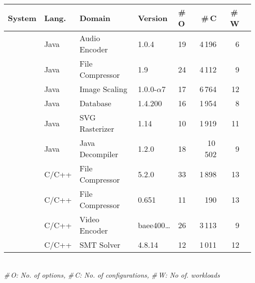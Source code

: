 \begin{tabular}{p{1.1cm}p{0.6cm}p{1.9cm}p{0.99cm}p{0.2cm}rrr}
		\toprule
		\textbf{System} & \textbf{Lang.} & \textbf{Domain} & \textbf{Version} & \textbf{\#\,O} & \textbf{\#\,C} & \textbf{\#\,W}  \\
		
		 
		\midrule
		\jumper & Java & Audio Encoder & 1.0.4 & 19 & 4\,196 & 6   \\
		
		\kanzi &Java  & File Compressor & 1.9 & 24 & 4\,112 & 9 \\
			
		\dconvert & Java & Image Scaling & 1.0.0-$\alpha$7 & 17 & 6\,764 & 12  \\
				
		\htwo & Java & Database & 1.4.200 & 16 & 1\,954  & 8  \\
		
		\batik & Java & SVG Rasterizer & 1.14 & 10 & 1\,919 &  11  \\
		
		\jadx & Java & Java Decompiler & 1.2.0 & 18 & 10\,502 & 9  \\
		
		\midrule
		
		 \rowcolor{black}\xz & C/C++ & File Compressor & 5.2.0 & 33 & 1\,898 & 13  \\
		\lrzip & C/C++ & File Compressor & 0.651 & 11 & 190 & 13  \\
		
		\xzwo & C/C++ & Video Encoder & baee400\ldots & 26 & 3\,113 & 9  \\
		\zdrei & C/C++ & SMT Solver & 4.8.14 & 12 & 1\,011 & 12  \\
		
\bottomrule

\end{tabular}\\
{\centering\vspace{1mm}\textit{\#\,O: No. of options, \#\,C: No. of configurations, \#\,W: No of. workloads}}
